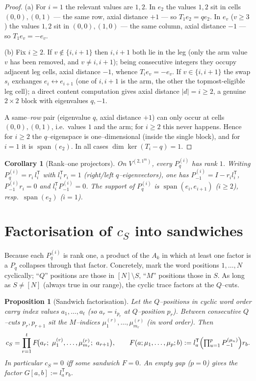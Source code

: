 \documentclass[11pt]{article}
\newtheorem{proposition}[theorem]{Proposition}
\newtheorem{corollary}[theorem]{Corollary}
\theoremstyle{definition}
\newcommand{\Pq}{P_{q}}
\newcommand{\Pm}{P_{-1}}
\begin{document}
\begin{proof}
(a) For $i=1$ the relevant values are $1,2$. In $e_2$ the values $1,2$ sit in cells
$(0,0),(0,1)$ --- the same row, axial distance $+1$ --- so $T_1e_2=q e_2$. In $e_v$
($v\ge3$) the values $1,2$ sit in $(0,0),(1,0)$ --- the same column, axial distance
$-1$ --- so $T_1e_v=-e_v$.

(b) Fix $i\ge2$. If $v\notin\{i,i+1\}$ then $i,i+1$ both lie in the leg (only the arm
value $v$ has been removed, and $v\ne i,i+1$); being consecutive integers they occupy
adjacent leg cells, axial distance $-1$, whence $T_ie_v=-e_v$. If $v\in\{i,i+1\}$ the
swap $s_i$ exchanges $e_i\leftrightarrow e_{i+1}$ (one of $i,i+1$ is the arm, the other
the topmost-eligible leg cell); a direct content computation gives axial distance
$|d|=i\ge2$, a genuine $2\times2$ block with eigenvalues $q,-1$.

A same--\emph{row} pair (eigenvalue $q$, axial distance $+1$) can only occur at cells
$(0,0),(0,1)$, i.e.\ values $1$ and the arm; for $i\ge2$ this never happens. Hence for
$i\ge2$ the $q$--eigenspace is one--dimensional (inside the single block), and for
$i=1$ it is $\operatorname{span}(e_2)$. In all cases $\dim\ker(T_i-q)=1$.
\end{proof}

\begin{corollary}[Rank--one projectors]\label{cor:rank1}
On $V^{(2,1^m)}$, every $\Pq^{(i)}$ has rank $1$. Writing $\Pq^{(i)}=r_i\,l_i^{\mathsf T}$
with $l_i^{\mathsf T}r_i=1$ (right/left $q$--eigenvectors), one has
$\Pm^{(i)}=I-r_i l_i^{\mathsf T}$, $\Pm^{(i)}r_i=0$ and $l_i^{\mathsf T}\Pm^{(i)}=0$. The
support of $\Pq^{(i)}$ is $\operatorname{span}(e_i,e_{i+1})$ ($i\ge2$), resp.\
$\operatorname{span}(e_2)$ ($i=1$).
\end{corollary}

\section{Factorisation of $c_S$ into sandwiches}

Because each $\Pq^{(i)}$ is rank one, a product of the $A_k$ in which at least one
factor is a $\Pq$ collapses through that factor. Concretely, mark the word positions
$1,\dots,N$ cyclically; ``$Q$'' positions are those in $[N]\setminus S$, ``$M$''
positions those in $S$. As long as $S\ne[N]$ (always true in our range), the cyclic
trace factors at the $Q$--cuts.

\begin{proposition}[Sandwich factorisation]\label{prop:factor}
Let the $Q$--positions in cyclic word order carry index values $a_1,\dots,a_t$ (so
$a_r=i_{p_r}$ at $Q$--position $p_r$). Between consecutive $Q$--cuts $p_r,p_{r+1}$ sit
the $M$--indices $\mu^{(r)}_1,\dots,\mu^{(r)}_{m_r}$ (in word order). Then
\[
c_S=\prod_{r=1}^{t} F\!\bigl(a_r;\ \mu^{(r)}_1,\dots,\mu^{(r)}_{m_r};\ a_{r+1}\bigr),
\qquad
F(a;\mu_1,\dots,\mu_p;b):=l_a^{\mathsf T}\Bigl(\textstyle\prod_{u=1}^p\Pm^{(\mu_u)}\Bigr)r_b .
\]
In particular $c_S=0$ iff some sandwich $F=0$. An \emph{empty} gap ($p=0$) gives the
factor $G[a,b]:=l_a^{\mathsf T}r_b$.
\end{proposition}
\end{document}
